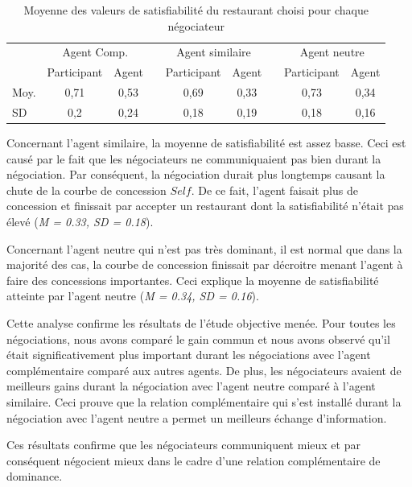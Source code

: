 	\begin{table}
		\centering
				\caption{Moyenne des valeurs de satisfiabilité du restaurant choisi pour chaque négociateur} 
	\begin{tabular} {lcccccccc}
		\hline
		& \multicolumn{2}{c}{Agent Comp.} & & \multicolumn{2}{c}{Agent similaire}& & \multicolumn{2}{c}{Agent neutre} \\ %
		\cline{2-3} \cline{5-6} \cline{8-9} %
		& Participant & Agent & & Participant & Agent & &  Participant & Agent \\ \hline
		Moy. &0,71 & 0,53 & &  0,69 & 0,33 & & 0,73 & 0,34 \\
		SD & 0,2 & 0,24 & &  0,18 & 0,19 & & 0,18 & 0,16 \\
		\hline
	\end{tabular}
			\label{tab:gainPerceptif}
	
\end{table}

	Concernant l'agent similaire, la moyenne de satisfiabilité est assez basse. Ceci est causé par le fait que les négociateurs ne communiquaient pas bien durant la négociation. Par conséquent, la négociation durait plus longtemps causant la chute de la courbe de concession $Self$. De ce fait, l'agent faisait plus de concession et finissait par accepter un restaurant dont la satisfiabilité n'était pas élevé (\emph{M = 0.33, SD = 0.18}).

	Concernant l'agent neutre qui n'est pas très dominant, il est normal que dans la majorité des cas, la courbe de concession finissait par décroitre menant l'agent à faire des concessions importantes. Ceci explique la moyenne de satisfiabilité atteinte par l'agent neutre  (\emph{M = 0.34, SD = 0.16}).
	
	Cette analyse confirme les résultats de l'étude objective menée.
	Pour toutes les négociations, nous avons comparé le gain commun et nous avons observé qu'il était significativement plus important durant les négociations avec l'agent complémentaire comparé aux autres agents. De plus, les négociateurs avaient de meilleurs gains durant la négociation avec l'agent neutre comparé à l'agent similaire. Ceci prouve que la relation complémentaire qui s'est installé durant la négociation avec l'agent neutre a permet un meilleurs échange d'information. 
	
	 Ces résultats confirme que les négociateurs communiquent mieux et par conséquent négocient mieux dans le cadre d'une relation complémentaire de dominance.  
	

